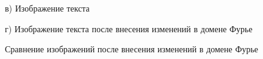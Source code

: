 \documentclass[12pt,a4paper]{article}
\begin{document}
\begin{figure}[h]
\begin{minipage}[h]{0.48\linewidth}
\end{minipage}
\vfill
\begin{minipage}[h]{0.48\linewidth}
 в) Изображение текста\vspace{\baselineskip} \\
\end{minipage}
\hfill
\begin{minipage}[h]{0.48\linewidth}
 г) Изображение текста после внесения изменений в домене Фурье \\
\end{minipage}
\caption{Сравнение изображений после внесения изменений в домене Фурье}
\label{fig:transform}
\end{figure}
\end{document}
